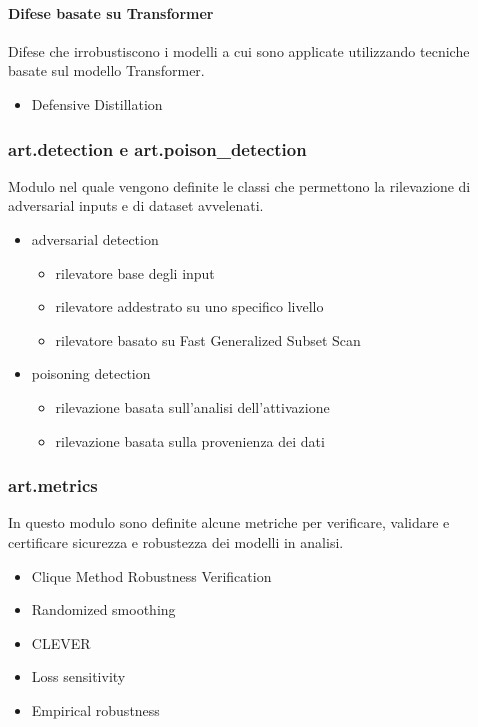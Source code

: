 \paragraph{Difese basate su Transformer}
Difese che irrobustiscono i modelli a cui sono applicate utilizzando tecniche basate sul modello Transformer.
    \begin{itemize}
        \item Defensive Distillation
    \end{itemize}

\subsubsection{art.detection e art.poison\_detection}
Modulo nel quale vengono definite le classi che permettono la rilevazione di adversarial inputs e  di dataset avvelenati.
\begin{itemize}
    \item adversarial detection \begin{itemize}
        \item rilevatore base degli input
        \item rilevatore addestrato su uno specifico livello
        \item rilevatore basato su Fast Generalized Subset Scan
    \end{itemize}
    \item poisoning detection \begin{itemize}
        \item rilevazione basata sull'analisi dell'attivazione
        \item rilevazione basata sulla provenienza dei dati
    \end{itemize}
\end{itemize}
\subsubsection{art.metrics}
In questo modulo sono definite alcune metriche per verificare, validare e certificare sicurezza e robustezza dei modelli in analisi. 

\begin{itemize}
    \item Clique Method Robustness Verification
    \item Randomized smoothing
    \item CLEVER
    \item Loss sensitivity
    \item Empirical robustness
\end{itemize}